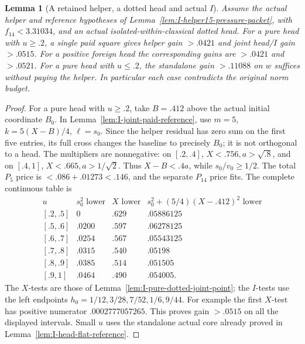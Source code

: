 \documentclass[11pt]{article}
\newtheorem{lemma}[theorem]{Lemma}
\theoremstyle{definition}
\theoremstyle{remark}
\begin{document}
\begin{lemma}[A retained helper, a dotted head and actual \(I\)]
\label{lem:I-helper15-head-coupling}
Assume the actual helper and reference hypotheses of
Lemma~\ref{lem:I-helper15-pressure-packet}, with \(f_{14}<3.31034\),
and an actual isolated-within-classical dotted head. For a pure head
with \(u\ge.2\), a single paid square gives helper gain \(>.0421\)
and joint head/\(I\) gain \(>.0515\). For a positive foreign head
the corresponding gains are \(>.0421\) and \(>.0521\).
For a pure head with \(u\le.2\), the standalone gain \(>.11088\)
on \(w\) suffices without paying the helper.
In particular each case contradicts the original norm budget.
\end{lemma}
\begin{proof}
For a pure head with \(u\ge.2\), take \(B=.412\) above the actual
initial coordinate \(B_0\). In
Lemma~\ref{lem:I-joint-paid-reference}, use \(m=5\),
\(k=5(X-B)/4\), \(\ell=s_0\). Since the helper residual has
zero sum on the first five entries, its full cross changes the
baseline to precisely \(B_0\); it is not orthogonal to a head.
The multipliers are nonnegative: on \([.2,.4]\),
\(X<.756,a>\sqrt{.8}\), and on \([.4,1]\),
\(X<.665,a>1/\sqrt2\). Thus \(X-B<.4a\), while
\(s_0/v_0\ge1/2\). The total \(P_5\) price is
\(<.086+.01273<.146\), and the separate \(P_{14}\) price fits.
The complete continuous table is
\[
\begin{array}{c|c|c|c}
u&s_0^2\text{ lower}&X\text{ lower}&
 s_0^2+(5/4)(X-.412)^2\text{ lower}\\ \hline
{}[.2,.5]&0&.629&.05886125\\
{}[.5,.6]&.0200&.597&.06278125\\
{}[.6,.7]&.0254&.567&.05543125\\
{}[.7,.8]&.0315&.540&.05198\\
{}[.8,.9]&.0385&.514&.051505\\
{}[.9,1]&.0464&.490&.054005 .
\end{array}
\]
The \(X\)-tests are those of
Lemma~\ref{lem:I-pure-dotted-joint-point}; the \(I\)-tests use
the left endpoints \(h_0=1/12,\allowbreak 3/28,\allowbreak 7/52,\allowbreak 1/6,\allowbreak 9/44\).
For example the first \(X\)-test has positive numerator
\(.0002777057265\). This proves gain \(>.0515\) on all the
displayed intervals. Small \(u\) uses the standalone actual core
already proved in Lemma~\ref{lem:I-head-flat-reference}.


\end{proof}
\end{document}
